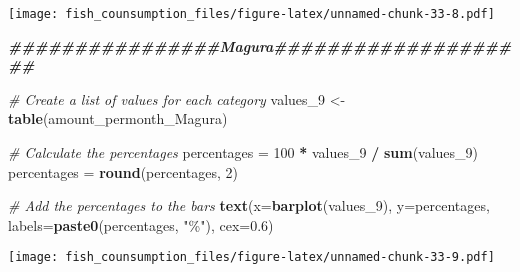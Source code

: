 \documentclass[
]{article}
\newenvironment{Shaded}{\begin{snugshade}}{\end{snugshade}}
\newcommand{\AttributeTok}[1]{\textcolor[rgb]{0.13,0.29,0.53}{#1}}
\newcommand{\CommentTok}[1]{\textcolor[rgb]{0.56,0.35,0.01}{\textit{#1}}}
\newcommand{\DecValTok}[1]{\textcolor[rgb]{0.00,0.00,0.81}{#1}}
\newcommand{\DocumentationTok}[1]{\textcolor[rgb]{0.56,0.35,0.01}{\textbf{\textit{#1}}}}
\newcommand{\FloatTok}[1]{\textcolor[rgb]{0.00,0.00,0.81}{#1}}
\newcommand{\FunctionTok}[1]{\textcolor[rgb]{0.13,0.29,0.53}{\textbf{#1}}}
\newcommand{\NormalTok}[1]{#1}
\newcommand{\OtherTok}[1]{\textcolor[rgb]{0.56,0.35,0.01}{#1}}
\newcommand{\SpecialCharTok}[1]{\textcolor[rgb]{0.81,0.36,0.00}{\textbf{#1}}}
\newcommand{\StringTok}[1]{\textcolor[rgb]{0.31,0.60,0.02}{#1}}
\begin{document}
\texttt{[image: fish\_counsumption\_files/figure-latex/unnamed-chunk-33-8.pdf]}

\begin{Shaded}
\begin{Highlighting}[]
\DocumentationTok{\#\#\#\#\#\#\#\#\#\#\#\#\#\#\#\#Magura\#\#\#\#\#\#\#\#\#\#\#\#\#\#\#\#\#\#\#\#}

\CommentTok{\# Create a list of values for each category}
\NormalTok{values\_9 }\OtherTok{\textless{}{-}} \FunctionTok{table}\NormalTok{(amount\_permonth\_Magura)}

\CommentTok{\# Calculate the percentages}
\NormalTok{percentages }\OtherTok{=} \DecValTok{100} \SpecialCharTok{*}\NormalTok{ values\_9 }\SpecialCharTok{/} \FunctionTok{sum}\NormalTok{(values\_9)}
\NormalTok{percentages }\OtherTok{=} \FunctionTok{round}\NormalTok{(percentages, }\DecValTok{2}\NormalTok{)}

\CommentTok{\# Add the percentages to the bars}
\FunctionTok{text}\NormalTok{(}\AttributeTok{x=}\FunctionTok{barplot}\NormalTok{(values\_9), }\AttributeTok{y=}\NormalTok{percentages, }\AttributeTok{labels=}\FunctionTok{paste0}\NormalTok{(percentages, }\StringTok{"\%"}\NormalTok{), }\AttributeTok{cex=}\FloatTok{0.6}\NormalTok{)}
\end{Highlighting}
\end{Shaded}

\texttt{[image: fish\_counsumption\_files/figure-latex/unnamed-chunk-33-9.pdf]}
\end{document}
